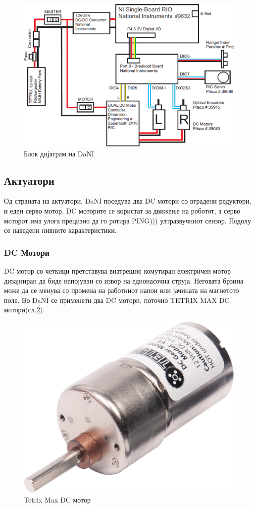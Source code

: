 \documentclass{article}
\begin{document}
\begin{figure}[H]
\includegraphics[width=0.75\linewidth]{dani_block_diagram.png}
\centering
\caption{Блок дијаграм на DaNI}
\label{fig:dani_block_diagram.png}
\end{figure}

\subsection{Актуатори}
Од страната на актуатори, DaNI поседува два DC мотори со вградени редуктори, и еден серво мотор. DC моторите се користат за движење на роботот, а серво моторот има улога прецизно да го ротира PING))) ултразвучниот сензор. Подолу се наведени нивните карактеристики.

\subsubsection{DC Мотори}
DC мотор со четкици претставува внатрешно комутиран електричен мотор дизајниран да биде напојуван со извор на еднонасочна струја. Неговата брзина може да се менува со промена на работниот напон или јачината на магнетото поле.
Во DaNI се применети два DC мотори, поточно TETRIX MAX DC мотори(сл.\ref{fig:dc_motor_iso.png}).

\begin{figure}[H]
\includegraphics[width=0.35\linewidth]{dc_motor_iso.png}
\centering
\caption{Tetrix Max DC мотор}
\label{fig:dc_motor_iso.png}
\end{figure}
\end{document}
